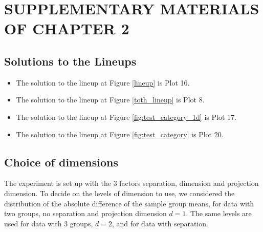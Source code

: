 \appendixtitle
\appendix
\chapter{SUPPLEMENTARY MATERIALS OF CHAPTER 2}

%




\section{Solutions to the Lineups}
\begin{itemize}
\item The solution to the lineup at Figure \ref{lineup} is Plot 16. 
\item The solution to the lineup at Figure \ref{toth_lineup} is Plot 8.
\item The solution to the lineup at Figure \ref{fig:test_category_1d} is Plot 17.
\item The solution to the lineup at Figure \ref{fig:test_category} is Plot 20.

\end{itemize}

\section{Choice of dimensions} \label{sec:theory}

The experiment is set up with the 3 factors separation, dimension and projection dimension. To decide on the levels of dimension to use, we considered the distribution of the absolute difference of the sample group means, for data with two groups, no separation and projection dimension $d=1$. The same levels are used for data with 3 groups, $d=2$, and for data with separation. 

